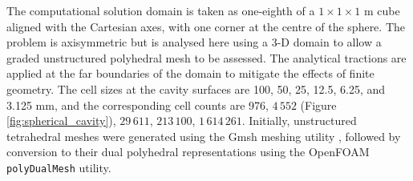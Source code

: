 \documentclass[sn-mathphys,Numbered]{sn-jnl}%
\begin{document}
The computational solution domain is taken as one-eighth of a $1 \times 1 \times 1$ m cube aligned with the Cartesian axes, with one corner at the centre of the sphere.
The problem is axisymmetric but is analysed here using a 3-D domain to allow a graded unstructured polyhedral mesh to be assessed.
The analytical tractions are applied at the far boundaries of the domain to mitigate the effects of finite geometry.
The cell sizes at the cavity surfaces are 100, 50, 25, 12.5, 6.25, and 3.125 mm, and the corresponding cell counts are 976, $4\,552$ (Figure \ref{fig:spherical_cavity}), $29\,611$, $213\,100$, $1\,614\,261$.
Initially, unstructured tetrahedral meshes were generated using the Gmsh meshing utility \cite{geuzaine2009gmsh}, followed by conversion to their dual polyhedral representations using the OpenFOAM \texttt{polyDualMesh} utility.
\end{document}
